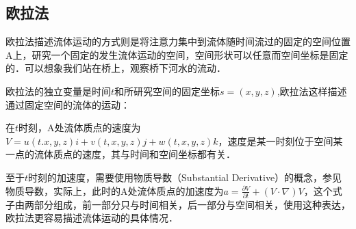 \subsection{欧拉法}
欧拉法描述流体运动的方式则是将注意力集中到流体随时间流过的固定的空间位置A上，研究一个固定的发生流体运动的空间，空间形状可以任意而空间坐标是固定的．可以想象我们站在桥上，观察桥下河水的流动．

欧拉法的独立变量是时间$t$和所研究空间的固定坐标$s=(x,y,z)$,欧拉法这样描述通过固定空间的流体的运动：

在$t$时刻，A处流体质点的速度为$V=u(t.x,y,z)i+v(t,x,y,z)j+w(t,x,y,z)k$，速度是某一时刻位于空间某一点的流体质点的速度，其与时间和空间坐标都有关．

至于$t$时刻的加速度，需要使用物质导数（Substantial  Derivative）的概念，参见物质导数，实际上，此时的A处流体质点的加速度为$a=\frac{\partial V}{\partial t}+\left ( V\cdot \nabla \right )V$，这个式子由两部分组成，前一部分只与时间相关，后一部分与空间相关，使用这种表达，欧拉法更容易描述流体运动的具体情况．
